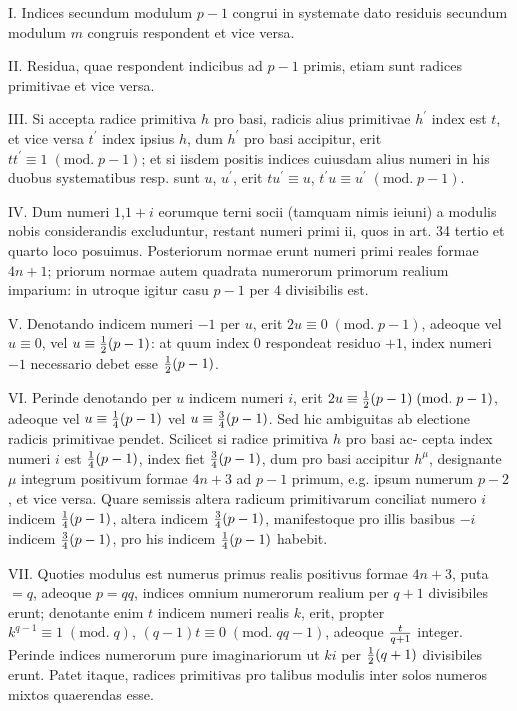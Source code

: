 \documentclass[twoside,12pt, showframe]{memoir}
\renewcommand{\pmod}[1]{\;(\textrm{mod.}\;#1)}
\let\oldfrac\frac
\def\frac#1#2{\mathchoice{\tfrac{#1}{#2}}{\oldfrac{#1}{#2}}{\genfrac{}{}{}{2}{#1}{#2\mathstrut}}{\genfrac{}{}{}{3}{#1}{#2\mathstrut}}}
\begin{document}
I. Indices secundum modulum \(p-1\) congrui in systemate dato residuis secundum modulum \(m\) congruis respondent et vice versa.
 
II. Residua, quae respondent indicibus ad \(p-1\) primis, etiam sunt radices primitivae et vice versa.
 
III. Si accepta radice primitiva \(h\) pro basi, radicis alius primitivae \(h^{\prime}\) index est \(t\), et vice versa \(t^{\prime}\) index ipsius \(h\), dum \(h^{\prime}\) pro basi accipitur, erit \(t t^{\prime} \equiv 1\pmod{p-1}\); et si iisdem positis indices cuiusdam alius numeri in his duobus systematibus resp. sunt \(u\), \(u^{\prime}\), erit \(t u^{\prime} \equiv u\), \(t^{\prime} u \equiv u^{\prime}\pmod{p-1}\).
 
IV. Dum numeri \(1\),\(1+i\) eorumque terni socii (tamquam nimis ieiuni) a modulis nobis considerandis excluduntur, restant numeri primi ii, quos in art. 34 tertio et quarto loco posuimus. Posteriorum normae erunt numeri primi reales formae \(4 n+1\); priorum normae autem quadrata numerorum primorum realium imparium: in utroque igitur casu \(p-1\) per \(4\) divisibilis est.

V. Denotando indicem numeri \(-1\) per \(u\), erit \(2 u \equiv 0\pmod{p-1}\), adeoque vel \(u \equiv 0\), vel \(u \equiv \frac{1}{2}(p-1)\): at quum index \(0\) respondeat residuo \(+1\), index numeri \(-1\) necessario debet esse \(\frac{1}{2}(p-1)\).
 
VI. Perinde denotando per \(u\) indicem numeri \(i\), erit \(2 u \equiv \frac{1}{2}(p-1) \pmod{p-1}\), adeoque vel \(u \equiv \frac{1}{4}(p-1)\) vel \(u \equiv \frac{3}{4}(p-1)\). Sed hic ambiguitas ab electione radicis primitivae pendet. Scilicet si radice primitiva \(h\) pro basi ac-\clearpage\noindent%
cepta index numeri \(i\) est \(\frac{1}{4}(p-1)\), index fiet \(\frac{3}{4}(p-1)\), dum pro basi accipitur \(h^{\mu}\), designante \(\mu\) integrum positivum formae \(4 n+3\) ad \(p-1\) primum, e.g. ipsum numerum \(p-2\), et vice versa. Quare semissis altera radicum primitivarum conciliat numero \(i\) indicem \(\frac{1}{4}(p-1)\), altera indicem \(\frac{3}{4}(p-1)\), manifestoque pro illis basibus \(-i\) indicem \(\frac{3}{4}(p-1)\), pro his indicem \(\frac{1}{4}(p-1)\) habebit.
 
VII. Quoties modulus est numerus primus realis positivus formae \(4 n+3\), puta \(=q\), adeoque \(p=q q\), indices omnium numerorum realium per \(q+1\) divisibiles erunt; denotante enim \(t\) indicem numeri realis \(k\), erit, propter \(k^{q-1} \equiv 1\pmod{q}\), \((q-1) t \equiv 0\pmod{q q-1}\), adeoque \(\frac{t}{q+1}\) integer. Perinde indices numerorum pure imaginariorum ut \(k i\) per \(\frac{1}{2}(q+1)\) divisibiles erunt. Patet itaque, radices primitivas pro talibus modulis inter solos numeros mixtos quaerendas esse.
 
\end{document}
